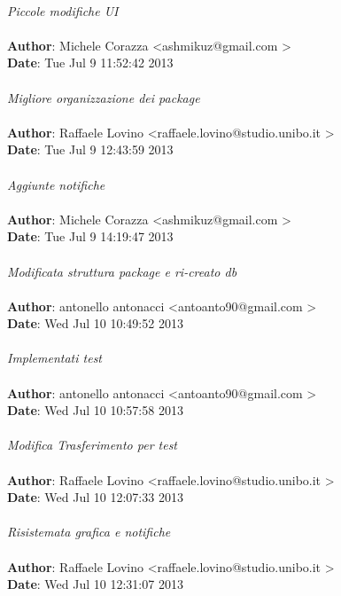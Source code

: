 \documentclass[a4paper,12pt]{article} %
\begin{document}
\\
    \emph{Piccole modifiche UI}\\
\\
\textbf{Author}: Michele Corazza \textless ashmikuz@gmail.com \textgreater \\
\textbf{Date}:   Tue Jul 9 11:52:42 2013 \\
\\
    \emph{Migliore organizzazione dei package}\\
\\
\textbf{Author}: Raffaele Lovino \textless raffaele.lovino@studio.unibo.it \textgreater \\
\textbf{Date}:   Tue Jul 9 12:43:59 2013 \\
\\
    \emph{Aggiunte notifiche}\\
\\
\textbf{Author}: Michele Corazza \textless ashmikuz@gmail.com \textgreater \\
\textbf{Date}:   Tue Jul 9 14:19:47 2013 \\
\\
    \emph{Modificata struttura package e ri-creato db}\\
\\
\textbf{Author}: antonello antonacci \textless antoanto90@gmail.com \textgreater \\
\textbf{Date}:   Wed Jul 10 10:49:52 2013 \\
\\
    \emph{Implementati test}\\
\\
\textbf{Author}: antonello antonacci \textless antoanto90@gmail.com \textgreater \\
\textbf{Date}:   Wed Jul 10 10:57:58 2013 \\
\\
    \emph{Modifica Trasferimento per test}\\
\\
\textbf{Author}: Raffaele Lovino \textless raffaele.lovino@studio.unibo.it \textgreater \\
\textbf{Date}:   Wed Jul 10 12:07:33 2013 \\
\\
    \emph{Risistemata grafica e notifiche}\\
\\
\textbf{Author}: Raffaele Lovino \textless raffaele.lovino@studio.unibo.it \textgreater \\
\textbf{Date}:   Wed Jul 10 12:31:07 2013 \\
\end{document}
